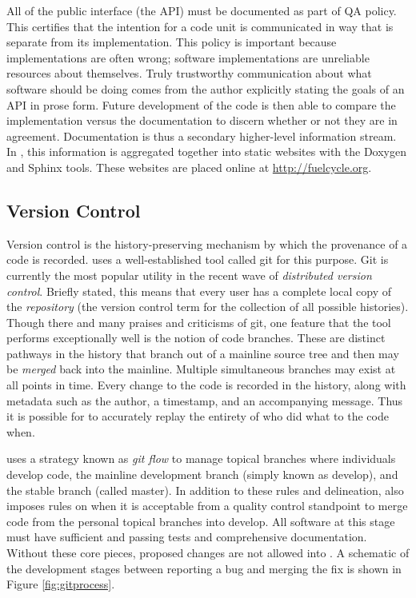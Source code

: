 All of the public interface (the \gls{API}) must be documented as part of \Cyclus
\gls{QA} policy. This certifies that the intention for a code unit is communicated 
in way that is separate from its implementation. This policy is important 
because implementations are often wrong; software implementations are unreliable 
resources about themselves. Truly trustworthy communication about what 
software should be doing comes from the author explicitly stating the 
goals of an \gls{API} in prose form. Future development of the code is then able to 
compare the implementation versus the documentation to discern whether or not they 
are in agreement. Documentation is thus a secondary higher-level information 
stream.  In \Cyclus, this information is aggregated together into static 
websites with the Doxygen \cite{van_heesch_doxygen:_2008} and Sphinx 
\cite{brandl_sphinx_2014} 
tools. These websites are placed online at \url{http://fuelcycle.org}.

\subsection{Version Control}

Version control is the history-preserving mechanism by which the provenance of 
a code is recorded. \Cyclus uses a well-established tool called git 
\cite{software_freedom_conservancy_git_2014}
for this purpose. Git is currently the most popular utility in the recent wave
of \emph{distributed version control}. Briefly stated, this means that every 
user has a complete local copy of the \emph{repository} (the version control
term for the collection of all possible histories).
Though there and many praises and criticisms of git, one 
feature that the tool performs exceptionally well is the notion of code branches.
These are distinct pathways in the history that branch out of a mainline source
tree and then may be \emph{merged} back into the mainline. Multiple simultaneous
branches may exist at all points in time. Every change to the code is recorded
in the history, along with metadata such as the author, a timestamp, and an 
accompanying message. Thus 
it is possible for \Cyclus to accurately replay the entirety of who did what to the
code when.

\Cyclus uses a strategy known as \emph{git flow} 
\cite{kalliamvakou_code-centric_2014} 
to manage topical branches where individuals develop code, the mainline development
branch (simply known as develop), and the stable branch (called master).
In addition to these rules and delineation, \Cyclus also imposes rules on 
when it is acceptable from a quality control standpoint to merge code from 
the personal topical branches into develop. All software at this stage 
must have sufficient and passing tests and comprehensive documentation. Without
these core pieces, proposed changes are not allowed into \Cyclus. A schematic of 
the development stages between reporting a bug and merging the fix is shown in 
Figure \ref{fig:gitprocess}. 

